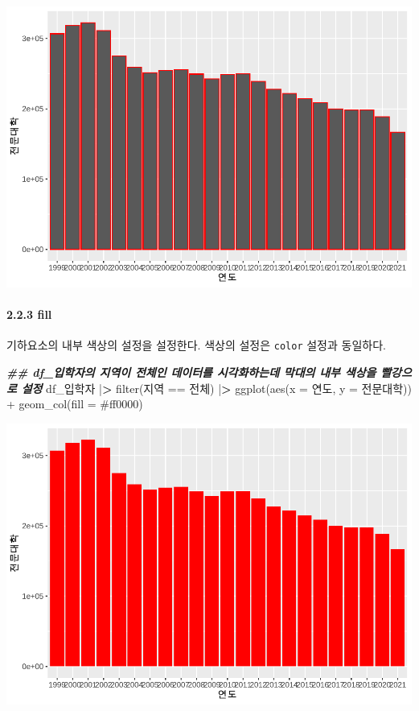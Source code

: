 \documentclass[
]{article}
\newenvironment{Shaded}{\begin{snugshade}}{\end{snugshade}}
\newcommand{\AttributeTok}[1]{\textcolor[rgb]{0.77,0.63,0.00}{#1}}
\newcommand{\DocumentationTok}[1]{\textcolor[rgb]{0.56,0.35,0.01}{\textbf{\textit{#1}}}}
\newcommand{\ErrorTok}[1]{\textcolor[rgb]{0.64,0.00,0.00}{\textbf{#1}}}
\newcommand{\FunctionTok}[1]{\textcolor[rgb]{0.00,0.00,0.00}{#1}}
\newcommand{\NormalTok}[1]{#1}
\newcommand{\SpecialCharTok}[1]{\textcolor[rgb]{0.00,0.00,0.00}{#1}}
\newcommand{\StringTok}[1]{\textcolor[rgb]{0.31,0.60,0.02}{#1}}
\begin{document}
\includegraphics{chap3_files/figure-latex/unnamed-chunk-8-1.pdf}

\hypertarget{fill}{%
\paragraph{2.2.3 fill}\label{fill}}

기하요소의 내부 색상의 설정을 설정한다. 색상의 설정은 \texttt{color} 설정과 동일하다.

\begin{Shaded}
\begin{Highlighting}[]
\DocumentationTok{\#\# df\_입학자의 지역이 \textquotesingle{}전체\textquotesingle{}인 데이터를 시각화하는데 막대의 내부 색상을 빨강으로 설정}
\NormalTok{df\_입학자 }\SpecialCharTok{|}\ErrorTok{\textgreater{}} \FunctionTok{filter}\NormalTok{(지역 }\SpecialCharTok{==} \StringTok{\textquotesingle{}전체\textquotesingle{}}\NormalTok{) }\SpecialCharTok{|}\ErrorTok{\textgreater{}}
  \FunctionTok{ggplot}\NormalTok{(}\FunctionTok{aes}\NormalTok{(}\AttributeTok{x =}\NormalTok{ 연도, }\AttributeTok{y =}\NormalTok{ 전문대학)) }\SpecialCharTok{+}
  \FunctionTok{geom\_col}\NormalTok{(}\AttributeTok{fill =} \StringTok{\textquotesingle{}\#ff0000\textquotesingle{}}\NormalTok{)}
\end{Highlighting}
\end{Shaded}

\includegraphics{chap3_files/figure-latex/unnamed-chunk-9-1.pdf}
\end{document}
